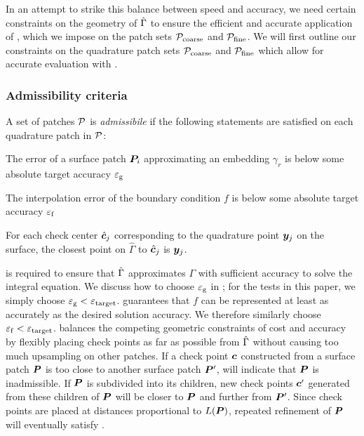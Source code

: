 In an attempt to strike this balance between speed and accuracy, we need certain constraints on the geometry of $\hat{\Gamma}$ to ensure the efficient and accurate application of \qbkix, which we impose on the patch sets ${\mathcal{P}_{\mathrm{coarse}}}$ and ${\mathcal{P}_{\mathrm{fine}}}$.
We will first outline our constraints on the quadrature patch sets ${\mathcal{P}_{\mathrm{coarse}}}$ and ${\mathcal{P}_{\mathrm{fine}}}$ which allow for accurate evaluation with \qbkix.

\subsubsection{Admissibility criteria\label{sec:admissible}}
A set of patches ${\mathcal{P}}$ is \textit{admissibile} if the following statements are satisfied on each quadrature patch in ${\mathcal{P}}$:
\begin{criteria}
  \item The error of a surface patch ${\bm{P}}_i$ approximating an embedding $\gamma_r$ is below some absolute target accuracy ${\varepsilon_{\mathrm{g}}}$ \label{criteria:1}
  \item The interpolation error of the boundary condition $f$ is below some absolute target accuracy ${\varepsilon_{\mathrm{f}}}$ \label{criteria:2}
  \item For each check center ${\hat{\bm{c}}}_j$ corresponding to the quadrature point ${\bm{y}}_j$ on the surface, the closest point on $\hat{\Gamma}$ to ${\hat{\bm{c}}}_j$ is ${\bm{y}}_j$. \label{criteria:3}
\end{criteria}

 is required to ensure that $\hat{\Gamma}$ approximates $\Gamma$ with sufficient accuracy to solve the integral equation.
We discuss how to choose ${\varepsilon_{\mathrm{g}}}$ in \cite[Section 6]{morse2020bsupplementary}; for the tests in this paper, we simply choose ${\varepsilon_{\mathrm{g}}} < {\varepsilon_{\mathrm{target}}}$.
 guarantees that $f$ can be represented at least as accurately as the desired solution accuracy.
We therefore similarly choose ${\varepsilon_{\mathrm{f}}} < {\varepsilon_{\mathrm{target}}}$. 
  balances the competing geometric constraints of cost and accuracy by flexibly placing check points as far as possible from $\hat{\Gamma}$ without causing too much upsampling on other patches.
If a check point ${\bm{c}}$ constructed from a surface patch ${\bm{P}}$ is too close to another surface patch ${\bm{P}}'$,  will indicate that ${\bm{P}}$ is inadmissible. 
If ${\bm{P}}$ is subdivided into its children, new check points ${\bm{c}}^\prime$ generated from these children of ${\bm{P}}$ will be closer to ${\bm{P}}$ and further from ${\bm{P}}'$.
Since check points are placed at distances proportional to $L({\bm{P}})$, repeated refinement of ${\bm{P}}$ will eventually satisfy . 

